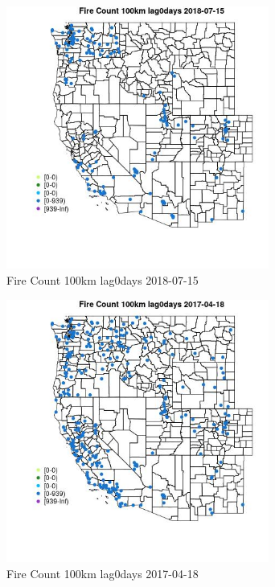 \begin{figure} 
\centering  
\includegraphics[width=0.77\textwidth]{Code_Outputs/Report_ML_input_PM25_Step4_part_e_de_duplicated_aves_compiled_2019-05-21wNAs_MapObsFire_Count_100km_lag0days2018-07-15.jpg} 
\caption{\label{fig:Report_ML_input_PM25_Step4_part_e_de_duplicated_aves_compiled_2019-05-21wNAsMapObsFire_Count_100km_lag0days2018-07-15}Fire Count 100km lag0days 2018-07-15} 
\end{figure} 
 

\begin{figure} 
\centering  
\includegraphics[width=0.77\textwidth]{Code_Outputs/Report_ML_input_PM25_Step4_part_e_de_duplicated_aves_compiled_2019-05-21wNAs_MapObsFire_Count_100km_lag0days2017-04-18.jpg} 
\caption{\label{fig:Report_ML_input_PM25_Step4_part_e_de_duplicated_aves_compiled_2019-05-21wNAsMapObsFire_Count_100km_lag0days2017-04-18}Fire Count 100km lag0days 2017-04-18} 
\end{figure} 
 

